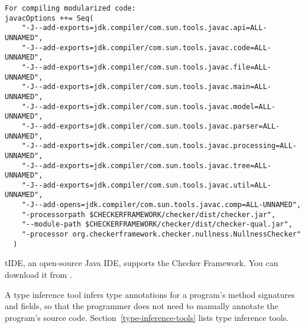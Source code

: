 
\begin{Verbatim}
For compiling modularized code:
javacOptions ++= Seq(
    "-J--add-exports=jdk.compiler/com.sun.tools.javac.api=ALL-UNNAMED",
    "-J--add-exports=jdk.compiler/com.sun.tools.javac.code=ALL-UNNAMED",
    "-J--add-exports=jdk.compiler/com.sun.tools.javac.file=ALL-UNNAMED",
    "-J--add-exports=jdk.compiler/com.sun.tools.javac.main=ALL-UNNAMED",
    "-J--add-exports=jdk.compiler/com.sun.tools.javac.model=ALL-UNNAMED",
    "-J--add-exports=jdk.compiler/com.sun.tools.javac.parser=ALL-UNNAMED",
    "-J--add-exports=jdk.compiler/com.sun.tools.javac.processing=ALL-UNNAMED",
    "-J--add-exports=jdk.compiler/com.sun.tools.javac.tree=ALL-UNNAMED",
    "-J--add-exports=jdk.compiler/com.sun.tools.javac.util=ALL-UNNAMED",
    "-J--add-opens=jdk.compiler/com.sun.tools.javac.comp=ALL-UNNAMED",
    "-processorpath $CHECKERFRAMEWORK/checker/dist/checker.jar",
    "--module-path $CHECKERFRAMEWORK/checker/dist/checker-qual.jar",
    "-processor org.checkerframework.checker.nullness.NullnessChecker"
  )
\end{Verbatim}



\begin{sloppypar}
tIDE, an open-source Java IDE, supports the Checker Framework.
You can download it from .
\end{sloppypar}



A type inference tool infers type annotations for a program's method
signatures and fields, so that the programmer does not need to manually
annotate the program's source code.  Section~\ref{type-inference-tools}
lists type inference tools.



